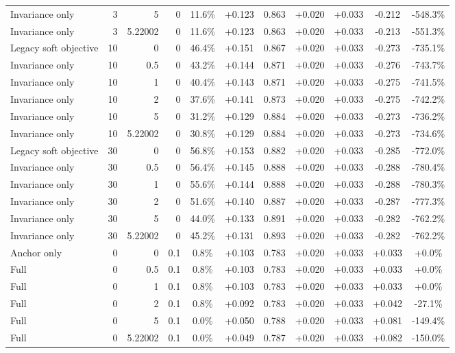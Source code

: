 \begin{table}[htbp]
\begin{tabular}{lrrrccccccc}
Invariance only & 3 & 5 & 0 & 11.6\% & +0.123 & 0.863 & +0.020 & +0.033 & -0.212 & -548.3\% \\
Invariance only & 3 & 5.22002 & 0 & 11.6\% & +0.123 & 0.863 & +0.020 & +0.033 & -0.213 & -551.3\% \\
Legacy soft objective & 10 & 0 & 0 & 46.4\% & +0.151 & 0.867 & +0.020 & +0.033 & -0.273 & -735.1\% \\
Invariance only & 10 & 0.5 & 0 & 43.2\% & +0.144 & 0.871 & +0.020 & +0.033 & -0.276 & -743.7\% \\
Invariance only & 10 & 1 & 0 & 40.4\% & +0.143 & 0.871 & +0.020 & +0.033 & -0.275 & -741.5\% \\
Invariance only & 10 & 2 & 0 & 37.6\% & +0.141 & 0.873 & +0.020 & +0.033 & -0.275 & -742.2\% \\
Invariance only & 10 & 5 & 0 & 31.2\% & +0.129 & 0.884 & +0.020 & +0.033 & -0.273 & -736.2\% \\
Invariance only & 10 & 5.22002 & 0 & 30.8\% & +0.129 & 0.884 & +0.020 & +0.033 & -0.273 & -734.6\% \\
Legacy soft objective & 30 & 0 & 0 & 56.8\% & +0.153 & 0.882 & +0.020 & +0.033 & -0.285 & -772.0\% \\
Invariance only & 30 & 0.5 & 0 & 56.4\% & +0.145 & 0.888 & +0.020 & +0.033 & -0.288 & -780.4\% \\
Invariance only & 30 & 1 & 0 & 55.6\% & +0.144 & 0.888 & +0.020 & +0.033 & -0.288 & -780.3\% \\
Invariance only & 30 & 2 & 0 & 51.6\% & +0.140 & 0.887 & +0.020 & +0.033 & -0.287 & -777.3\% \\
Invariance only & 30 & 5 & 0 & 44.0\% & +0.133 & 0.891 & +0.020 & +0.033 & -0.282 & -762.2\% \\
Invariance only & 30 & 5.22002 & 0 & 45.2\% & +0.131 & 0.893 & +0.020 & +0.033 & -0.282 & -762.2\% \\
Anchor only & 0 & 0 & 0.1 & 0.8\% & +0.103 & 0.783 & +0.020 & +0.033 & +0.033 & +0.0\% \\
Full & 0 & 0.5 & 0.1 & 0.8\% & +0.103 & 0.783 & +0.020 & +0.033 & +0.033 & +0.0\% \\
Full & 0 & 1 & 0.1 & 0.8\% & +0.103 & 0.783 & +0.020 & +0.033 & +0.033 & +0.0\% \\
Full & 0 & 2 & 0.1 & 0.8\% & +0.092 & 0.783 & +0.020 & +0.033 & +0.042 & -27.1\% \\
Full & 0 & 5 & 0.1 & 0.0\% & +0.050 & 0.788 & +0.020 & +0.033 & +0.081 & -149.4\% \\
Full & 0 & 5.22002 & 0.1 & 0.0\% & +0.049 & 0.787 & +0.020 & +0.033 & +0.082 & -150.0\% \\

\end{tabular}
\end{table}
